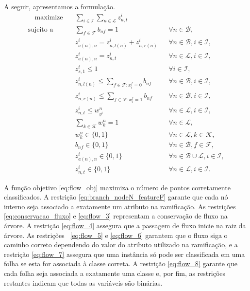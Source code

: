\documentclass[12pt,a4paper]{article}
\begin{document}
A seguir, apresentamos a formulação.
\begin{align}
\quad\text{maximize} \quad & \sum_{i \in \mathcal{I}}\sum_{n \in \mathcal{L}} z_{n,t}^i \label{eq:flow_obj}\\[4pt]
\text{sujeito a} \quad
& \sum_{f \in \mathcal{F}} b_{nf} = 1
&& \forall n \in \mathcal{B}, 
\label{eq:branch_nodeN_featureF}\\[4pt]
& z_{a(n),n}^i = z_{n,l(n)}^i + z_{n,r(n)}^i
&& \forall n \in \mathcal{B},i \in \mathcal{I},
\label{eq:conservacao_fluxo}\\[4pt]
& z_{a(n), n}^i = z_{n, t}^i
&& \forall n \in \mathcal{L},i \in \mathcal{I},
\label{eq:flow_3}\\[4pt]
& z_{s, 1}^i \leq 1 
&& \forall i \in \mathcal{I},
\label{eq:flow_4}\\[4pt]
& z_{n, l(n)}^i \leq \sum_{f \in \mathcal{F}: x_{i}^f = 0} b_{nf}
&& \forall n \in \mathcal{B},i \in \mathcal{I},
\label{eq:flow_5}\\[4pt]
& z_{n, r(n)}^i \leq \sum_{f \in \mathcal{F}: x_{i}^f = 1} b_{nf}
&& \forall n \in \mathcal{B},i \in \mathcal{I},
\label{eq:flow_6}\\[4pt]
& z_{n, t}^i \leq w_{y^i}^n
&& \forall n \in \mathcal{L},i \in \mathcal{I},
\label{eq:flow_7}\\[4pt]
& \sum_{k \in \mathcal{K}} w_{k}^n = 1
&& \forall n \in \mathcal{L},
\label{eq:flow_8}
\\[4pt]
& w_{k}^n \in \{0,1\}
&& \forall n \in \mathcal{L}, k \in \mathcal{K},
\label{eq:flow_9}\\[4pt] 
& b_{nf} \in \{0,1\}
&& \forall n \in \mathcal{B}, f \in \mathcal{F},
\label{eq:flow_10}\\[4pt]     
& z_{a(n), n}^i \in \{0,1\}
&& \forall n \in \mathcal{B} \cup \mathcal{L}, i \in \mathcal{I},
\label{eq:flow_11} \\[4pt]
& z_{n, t}^i \in \{0,1\}
&& \forall n \in \mathcal{L}, i \in \mathcal{I}.
\label{eq:flow_12}
\end{align}

A função objetivo \eqref{eq:flow_obj} maximiza o número de pontos corretamente classificados.
A restrição \eqref{eq:branch_nodeN_featureF} garante que cada nó interno
seja associado a exatamente um atributo na ramificação. As restrições \eqref{eq:conservacao_fluxo} e \eqref{eq:flow_3} representam a conservação de fluxo na árvore.
A restrição \eqref{eq:flow_4} assegura que a passagem de fluxo inicie na raiz da árvore.
As restrições~ \eqref{eq:flow_5} e \eqref{eq:flow_6} garantem que o fluxo siga o caminho correto
dependendo do valor do atributo utilizado na ramificação, e a restrição \eqref{eq:flow_7} assegura que uma instância só
pode ser classificada em uma folha se esta for associada à classe correta. A restrição \eqref{eq:flow_8} garante que cada folha seja associada a exatamente
uma classe e, por fim, as restrições restantes indicam que todas as variáveis são binárias.
\end{document}
